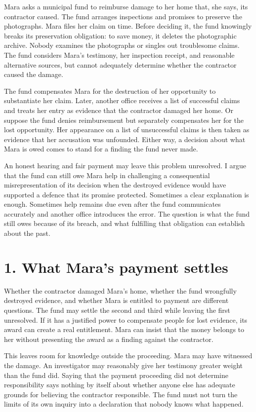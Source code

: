 \noindent Mara asks a municipal fund to reimburse damage to her home that, she says, its contractor caused. The fund arranges inspections and promises to preserve the photographs. Mara files her claim on time. Before deciding it, the fund knowingly breaks its preservation obligation: to save money, it deletes the photographic archive. Nobody examines the photographs or singles out troublesome claims. The fund considers Mara’s testimony, her inspection receipt, and reasonable alternative sources, but cannot adequately determine whether the contractor caused the damage.

The fund compensates Mara for the destruction of her opportunity to substantiate her claim. Later, another office receives a list of successful claims and treats her entry as evidence that the contractor damaged her home. Or suppose the fund denies reimbursement but separately compensates her for the lost opportunity. Her appearance on a list of unsuccessful claims is then taken as evidence that her accusation was unfounded. Either way, a decision about what Mara is owed comes to stand for a finding the fund never made.

An honest hearing and fair payment may leave this problem unresolved. I argue that the fund can still owe Mara help in challenging a consequential misrepresentation of its decision when the destroyed evidence would have supported a defence that its promise protected. Sometimes a clear explanation is enough. Sometimes help remains due even after the fund communicates accurately and another office introduces the error. The question is what the fund still owes because of its breach, and what fulfilling that obligation can establish about the past.

\section*{1. What Mara’s payment settles}

Whether the contractor damaged Mara’s home, whether the fund wrongfully destroyed evidence, and whether Mara is entitled to payment are different questions. The fund may settle the second and third while leaving the first unresolved. If it has a justified power to compensate people for lost evidence, its award can create a real entitlement. Mara can insist that the money belongs to her without presenting the award as a finding against the contractor.

This leaves room for knowledge outside the proceeding. Mara may have witnessed the damage. An investigator may reasonably give her testimony greater weight than the fund did. Saying that the payment proceeding did not determine responsibility says nothing by itself about whether anyone else has adequate grounds for believing the contractor responsible. The fund must not turn the limits of its own inquiry into a declaration that nobody knows what happened.

